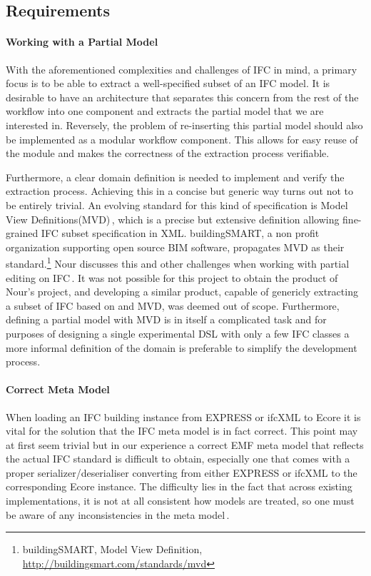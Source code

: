 \subsection{Requirements}
\label{subsec:requirements}
\paragraph{Working with a Partial Model}
With the aforementioned complexities and challenges of IFC in mind, a primary focus is to be able to extract a well-specified subset of an IFC model. It is desirable to have an architecture that separates this concern from the rest of the workflow into one component and extracts the partial model that we are interested in. Reversely, the problem of re-inserting this partial model should also be implemented as a modular workflow component. This allows for easy reuse of the module and makes the correctness of the extraction process verifiable.

Furthermore, a clear domain definition is needed to implement and verify the extraction process. Achieving this in a concise but generic way turns out not to be entirely trivial. An evolving standard for this kind of specification is Model View Definitions(MVD)\,\cite{nour08}, which is a precise but extensive definition allowing fine-grained IFC subset specification in XML. buildingSMART, a non profit organization supporting open source BIM software, propagates MVD as their standard.\footnote{buildingSMART, Model View Definition, \url{http://buildingsmart.com/standards/mvd}} Nour discusses this and other challenges when working with partial editing on IFC\,\cite{nour08}. It was not possible for this project to obtain the product of Nour's project, and developing a similar product, capable of genericly extracting a subset of IFC based on and MVD, was deemed out of scope. Furthermore, defining a partial model with MVD is in itself a complicated task and for purposes of designing a single experimental DSL with only a few IFC classes a more informal definition of the domain is preferable to simplify the development process.

\paragraph{Correct Meta Model}
When loading an IFC building instance from EXPRESS or ifcXML to Ecore it is vital for the solution that the IFC meta model is in fact correct. This point may at first seem trivial but in our experience a correct EMF meta model that reflects the actual IFC standard is difficult to obtain, especially one that comes with a proper serializer/deserialiser converting from either EXPRESS or ifcXML to the corresponding Ecore instance. The difficulty lies in the fact that across existing implementations, it is not at all consistent how models are treated, so one must be aware of any inconsistencies in the meta model\,\cite[pp. 4]{quteprints37725}. %


